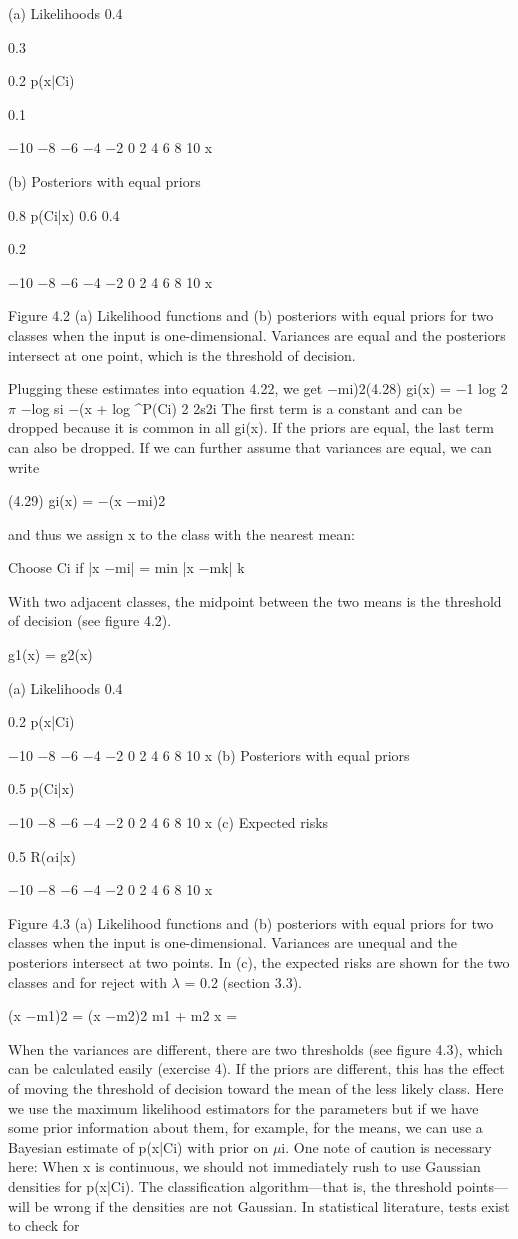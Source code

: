 (a) Likelihoods 0.4

0.3

0.2 p(x|Ci)

0.1

$-$10 $-$8 $-$6 $-$4 $-$2 0 2 4 6 8 10 x

(b) Posteriors with equal priors

0.8 p(Ci|x) 0.6 0.4

0.2

$-$10 $-$8 $-$6 $-$4 $-$2 0 2 4 6 8 10 x

Figure 4.2 (a) Likelihood functions and (b) posteriors with equal priors for two classes when the input is one-dimensional. Variances are equal and the posteriors intersect at one point, which is the threshold of decision.

Plugging these estimates into equation 4.22, we get $-$mi)2(4.28) gi(x) = $-$1 log 2$\pi$ $-$log si $-$(x + log \textasciicircum{}P(Ci) 2 2s2i The first term is a constant and can be dropped because it is common in all gi(x). If the priors are equal, the last term can also be dropped. If we can further assume that variances are equal, we can write

(4.29) gi(x) = $-$(x $-$mi)2

and thus we assign x to the class with the nearest mean:

Choose Ci if |x $-$mi| = min |x $-$mk| k

With two adjacent classes, the midpoint between the two means is the threshold of decision (see figure 4.2).

g1(x) = g2(x)

(a) Likelihoods 0.4

0.2 p(x|Ci)

$-$10 $-$8 $-$6 $-$4 $-$2 0 2 4 6 8 10 x (b) Posteriors with equal priors

0.5 p(Ci|x)

$-$10 $-$8 $-$6 $-$4 $-$2 0 2 4 6 8 10 x (c) Expected risks

0.5 R($\alpha$i|x)

$-$10 $-$8 $-$6 $-$4 $-$2 0 2 4 6 8 10 x

Figure 4.3 (a) Likelihood functions and (b) posteriors with equal priors for two classes when the input is one-dimensional. Variances are unequal and the posteriors intersect at two points. In (c), the expected risks are shown for the two classes and for reject with $\lambda$ = 0.2 (section 3.3).

(x $-$m1)2 = (x $-$m2)2 m1 + m2 x =

When the variances are different, there are two thresholds (see figure 4.3), which can be calculated easily (exercise 4). If the priors are different, this has the effect of moving the threshold of decision toward the mean of the less likely class. Here we use the maximum likelihood estimators for the parameters but if we have some prior information about them, for example, for the means, we can use a Bayesian estimate of p(x|Ci) with prior on $\mu$i. One note of caution is necessary here: When x is continuous, we should not immediately rush to use Gaussian densities for p(x|Ci). The classification algorithm---that is, the threshold points---will be wrong if the densities are not Gaussian. In statistical literature, tests exist to check for


